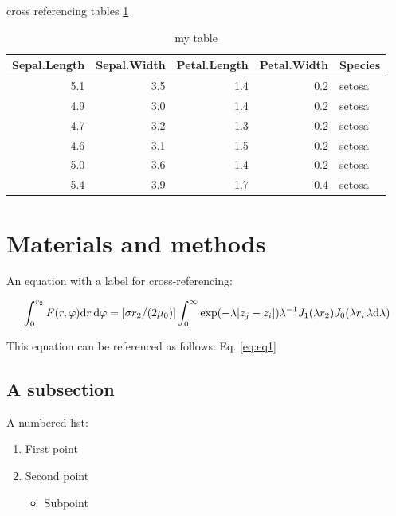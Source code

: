 \documentclass[12pt,halfline,a4paper,]{ouparticle}
\providecommand{\tightlist}{%
  \setlength{\itemsep}{0pt}\setlength{\parskip}{0pt}}
\begin{document}
cross referencing tables \ref{tab:iris}

\begin{table}

\caption{\label{tab:iris}my table}
\centering
\begin{tabular}[t]{r|r|r|r|l}
\hline
Sepal.Length & Sepal.Width & Petal.Length & Petal.Width & Species\\
\hline
5.1 & 3.5 & 1.4 & 0.2 & setosa\\
\hline
4.9 & 3.0 & 1.4 & 0.2 & setosa\\
\hline
4.7 & 3.2 & 1.3 & 0.2 & setosa\\
\hline
4.6 & 3.1 & 1.5 & 0.2 & setosa\\
\hline
5.0 & 3.6 & 1.4 & 0.2 & setosa\\
\hline
5.4 & 3.9 & 1.7 & 0.4 & setosa\\
\hline
\end{tabular}
\end{table}

\hypertarget{materials-and-methods}{%
\section{Materials and methods}\label{materials-and-methods}}

An equation with a label for cross-referencing:

\begin{equation}\label{eq:eq1}
\int^{r_2}_0 F(r,\varphi){\rm d}r\,{\rm d}\varphi = [\sigma r_2/(2\mu_0)]
\int^{\infty}_0\exp(-\lambda|z_j-z_i|)\lambda^{-1}J_1 (\lambda r_2)J_0
(\lambda r_i\,\lambda {\rm d}\lambda)
\end{equation}

This equation can be referenced as follows: Eq. \ref{eq:eq1}

\hypertarget{a-subsection}{%
\subsection{A subsection}\label{a-subsection}}

A numbered list:

\begin{enumerate}
\def\labelenumi{\arabic{enumi})}
\tightlist
\item
  First point
\item
  Second point

  \begin{itemize}
  \tightlist
  \item
    Subpoint
  \end{itemize}
\end{enumerate}
\end{document}
